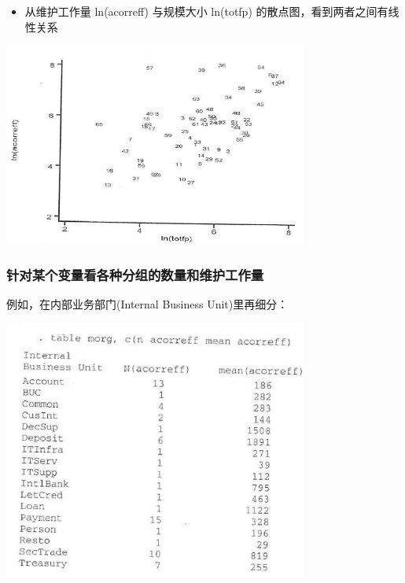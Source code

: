 \begin{itemize}
\tightlist
\item
  从维护工作量 ln(acorreff) 与规模大小 ln(totfp)
  的散点图，看到两者之间有线性关系
\end{itemize}


\includegraphics[width=10cm]{maxwell_f529.jpg}

\hypertarget{ux9488ux5bf9ux67d0ux4e2aux53d8ux91cfux770bux5404ux79cdux5206ux7ec4ux7684ux6570ux91cfux548cux7ef4ux62a4ux5de5ux4f5cux91cf}{%
\subsubsection{针对某个变量看各种分组的数量和维护工作量}\label{ux9488ux5bf9ux67d0ux4e2aux53d8ux91cfux770bux5404ux79cdux5206ux7ec4ux7684ux6570ux91cfux548cux7ef4ux62a4ux5de5ux4f5cux91cf}}

例如，在内部业务部门(Internal Business Unit)里再细分：


\includegraphics[width=10cm]{maxwell_e514.jpg}

